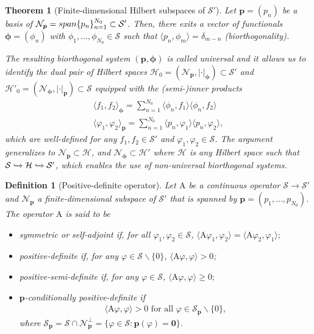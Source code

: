 \documentclass[10pt,a4paper]{amsart}
\newtheorem{theorem}{Theorem}
\newtheorem{definition}{Definition}
\def\Op#1{{\mathrm{#1}}}  %
\def\Spc#1{{\mathcal{#1}}}  %
\def\V#1{{\boldsymbol{#1}}}         %
\newcommand{\embedC}{\xhookrightarrow{}}
\begin{document}
\begin{theorem}[Finite-dimensional Hilbert subspaces of $\Spc S'$]
\label{Theo:FiniteDimHilbert}
Let $\V p=(p_n)$ be a basis of $\Spc N_{\V p}={\rm span}\{p_n\}_{n=1}^{N_0}\subset \Spc S'$. Then, there exits
 a vector of functionals $\V \phi=(\phi_n)$ with $\phi_1,\dots,\phi_{N_0}\in \Spc S$ such that
 $\langle p_n, \phi_m\rangle = \delta_{m-n}$ (biorthogonality).
 
The resulting biorthogonal system $(\V p, \V \phi)$ is called {\em universal} and it allows us to identify the dual pair of 
Hilbert spaces  $\Spc H_0=(\Spc N_{\V p},|\cdot|_{\V \phi}) \subset \Spc S'$ and
$\Spc H'_0=(\Spc N_{\V \phi},|\cdot|_{\V p}) \subset \Spc S$ equipped with the (semi-)inner
products
\begin{align}
\langle f_1,f_2\rangle_{\V \phi} = \sum_{n=1}^{N_0} \langle \phi_n,f_1 \rangle\langle \phi_n,f_2 \rangle\\ 
\langle \varphi_1,\varphi_2\rangle_{\V p} = \sum_{n=1}^{N_0} \langle p_n,\varphi_1 \rangle \langle p_n,\varphi_2 \rangle,
\end{align}
which are well-defined for any $f_1,f_2 \in \Spc S'$ and $\varphi_1,\varphi_2 \in \Spc S$.
The argument generalizes to $\Spc N_{\V p}\subset \Spc H$, and $\Spc N_{\V \phi}\subset \Spc H'$ where $\Spc H$ is any Hilbert space such that $\Spc S \embedC \Spc H \embedC \Spc S'$, which  enables the use of {\em non-universal} biorthogonal systems.
\end{theorem}

\begin{definition}[Positive-definite operator]
\label{Def:CondPositiveDef2}
Let  $\Op A$ be a continuous operator $\Spc S \to \Spc S'$ and $\Spc N_{\V p}$ a finite-dimensional subspace of $\Spc S'$ that is spanned by
$\V p=(p_1,\dots,p_{N_0})$.
The operator $\Op A$ is said to be
\begin{itemize}
\item symmetric or self-adjoint if, for all $\varphi_1,\varphi_2 \in \Spc S$,
$
\langle \Op A \varphi_1,\varphi_2\rangle=\langle \Op A \varphi_2,\varphi_1\rangle;
$
\item positive-definite if, for any  $\varphi \in \Spc S\backslash\{0\}
$,
$
\langle \Op A \varphi,\varphi\rangle > 0$;

\item positive-semi-definite if, for any  $\varphi \in \Spc S$,
$
\langle \Op A \varphi,\varphi\rangle \ge 0;
$\item $\V p$-conditionally positive-definite if
\begin{align}
\label{Eq:PositiveDefinite}
\langle \Op A \varphi,\varphi\rangle > 0
\mbox{ for all }\varphi \in  \Spc S_{\V p} \backslash\{0\},
\end{align}
where $\Spc S_{\V p}=\Spc S \cap \Spc N_{\V p}^\perp=\{\varphi \in \Spc S: \V p(\varphi)=\V 0\}$. 
\end{itemize}
\end{definition}
\end{document}
